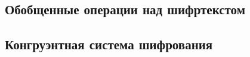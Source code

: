 

 \chapter{} \label{ch:ch1}
  

 \chapter{} \label{ch:ch2}

  \section{Обобщенные операции над шифртекстом} \label{sec:ch2/sec1}
   

  \section{Конгруэнтная система шифрования} \label{sec:ch2/sec2}
   


